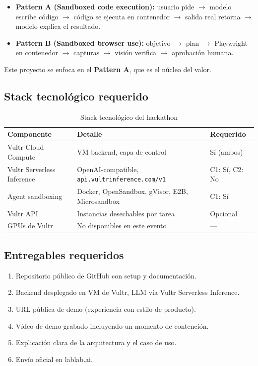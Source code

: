 \documentclass[11pt,a4paper]{article}
\begin{document}
\begin{itemize}
    \item \textbf{Pattern A (Sandboxed code execution):} usuario pide $\rightarrow$
    modelo escribe código $\rightarrow$ código se ejecuta en contenedor $\rightarrow$
    salida real retorna $\rightarrow$ modelo explica el resultado.
    \item \textbf{Pattern B (Sandboxed browser use):} objetivo $\rightarrow$ plan
    $\rightarrow$ Playwright en contenedor $\rightarrow$ capturas $\rightarrow$
    visión verifica $\rightarrow$ aprobación humana.
\end{itemize}

Este proyecto se enfoca en el \textbf{Pattern A}, que es el núcleo del valor.

\subsection{Stack tecnológico requerido}

\begin{table}[h]
\centering
\begin{tabular}{lll}
\toprule
\textbf{Componente} & \textbf{Detalle} & \textbf{Requerido} \\
\midrule
Vultr Cloud Compute & VM backend, capa de control & Sí (ambos) \\
Vultr Serverless Inference & OpenAI-compatible, \texttt{api.vultrinference.com/v1} & C1: Sí, C2: No \\
Agent sandboxing & Docker, OpenSandbox, gVisor, E2B, Microsandbox & C1: Sí \\
Vultr API & Instancias desechables por tarea & Opcional \\
GPUs de Vultr & No disponibles en este evento & --- \\
\bottomrule
\end{tabular}
\caption{Stack tecnológico del hackathon}
\end{table}

\subsection{Entregables requeridos}

\begin{enumerate}
    \item Repositorio público de GitHub con setup y documentación.
    \item Backend desplegado en VM de Vultr, LLM vía Vultr Serverless Inference.
    \item URL pública de demo (experiencia con estilo de producto).
    \item Vídeo de demo grabado incluyendo un momento de contención.
    \item Explicación clara de la arquitectura y el caso de uso.
    \item Envío oficial en lablab.ai.
\end{enumerate}
\end{document}
